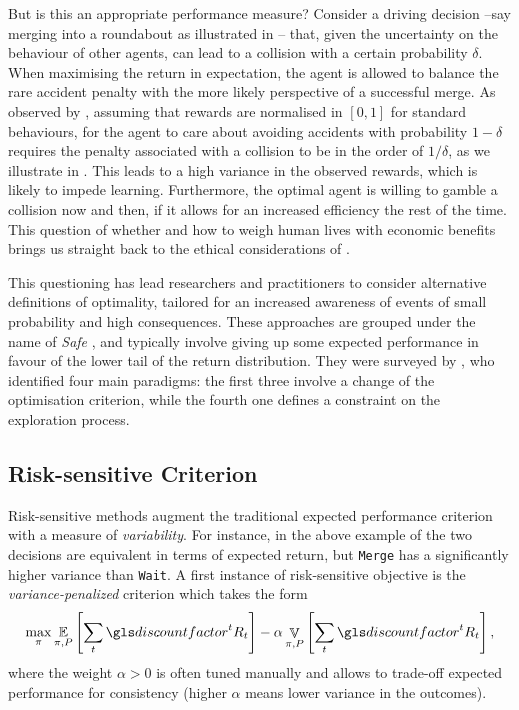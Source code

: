 But is this an appropriate performance measure? Consider a driving decision --say merging into a roundabout as illustrated in -- that, given the uncertainty on the behaviour of other agents, can lead to a collision with a certain probability $\delta$. When maximising the return in expectation, the agent is allowed to balance the rare accident penalty with the more likely perspective of a successful merge. As observed by \citet{ShalevShwartz2017}, assuming that rewards are normalised in $[0, 1]$ for standard behaviours, for the agent to care about avoiding accidents with probability $1-\delta$ requires the penalty associated with a collision to be in the order of $1/\delta$, as we illustrate in . This leads to a high variance in the observed rewards, which is likely to impede learning. 
Furthermore, the optimal agent is willing to gamble a collision now and then, if it allows for an increased efficiency the rest of the time. This question of whether and how to weigh human lives with economic benefits brings us straight back to the ethical considerations of .

This questioning has lead researchers and practitioners to consider alternative definitions of optimality, tailored for an increased awareness of events of small probability and high consequences. These approaches are grouped under the name of \emph{Safe} , and typically involve giving up some expected performance in favour of the lower tail of the return distribution. They were surveyed by \citet{Garcia2015}, who identified four main paradigms: the first three involve a change of the optimisation criterion, while the fourth one defines a constraint on the exploration process.

\subsection{Risk-sensitive Criterion}

Risk-sensitive methods augment the traditional expected performance criterion with a measure of \textit{variability}. For instance, in the above example of  the two decisions are equivalent in terms of expected return, but \texttt{Merge} has a significantly higher variance than \texttt{Wait}.  A first instance of risk-sensitive objective is the \emph{variance-penalized} criterion \citep{Markowitz59} which takes the form
\begin{equation*}
\max_\pi \expectedvalue_{\pi, P} \left[\sum_t \discount^t R_t\right] - \alpha\mathop{\mathbb{V}}_{\pi, P} \left[\sum_t \discount^t R_t \right],
\end{equation*}
where the weight $\alpha > 0$ is often tuned manually and allows to trade-off expected performance for consistency (higher $\alpha$ means lower variance in the outcomes).


